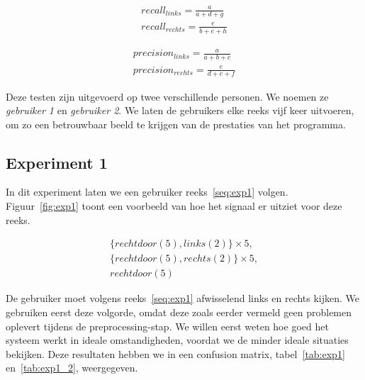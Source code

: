 \documentclass{article}
\begin{document}
\begin{equation}
\begin{aligned}
\label{eq:recall}
recall_{links} = \frac{a}{a + d + g} \\
recall_{rechts} = \frac{e}{b + e + h}
\end{aligned}
\end{equation}

\begin{equation}
\begin{aligned}
\label{eq:precision}
precision_{links} = \frac{a}{a + b + c} \\
precision_{rechts} = \frac{e}{d + e + f}
\end{aligned}
\end{equation}

Deze testen zijn uitgevoerd op twee verschillende personen. We noemen ze \textit{gebruiker 1} en \textit{gebruiker 2}. We laten de gebruikers elke reeks vijf keer uitvoeren, om zo een betrouwbaar beeld te krijgen van de prestaties van het programma.

\subsection{Experiment 1}

In dit experiment laten we een gebruiker reeks~\ref{seq:exp1} volgen. Figuur~\ref{fig:exp1} toont een voorbeeld van hoe het signaal er uitziet voor deze reeks. 

\begin{equation}
\begin{aligned}
\label{seq:exp1}
& \{rechtdoor(5), links(2)\} \times 5,& \\
& \{rechtdoor(5), rechts(2)\} \times 5,& \\
& rechtdoor(5) &
\end{aligned}
\end{equation}

De gebruiker moet volgens reeks~\ref{seq:exp1} afwisselend links en rechts kijken. We gebruiken eerst deze volgorde, omdat deze zoals eerder vermeld geen problemen oplevert tijdens de preprocessing-stap. We willen eerst weten hoe goed het systeem werkt in ideale omstandigheden, voordat we de minder ideale situaties bekijken. Deze resultaten hebben we in een confusion matrix, tabel~\ref{tab:exp1} en~\ref{tab:exp1_2}, weergegeven.
\end{document}
